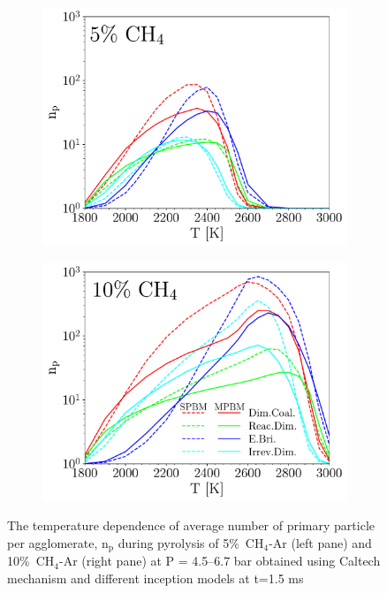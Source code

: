 \begin{figure}[H]
	\centering
	\begin{subfigure}[t]{0.4\textwidth}
		\includegraphics[width=1\textwidth]{Figures/Results/Shocktube/Agafonov2016/5CH4/n_p.pdf}
	\end{subfigure}
	\begin{subfigure}[t]{0.4\textwidth}
		\includegraphics[width=1\textwidth]{Figures/Results/Shocktube/Agafonov2016/10CH4/n_p.pdf}
	\end{subfigure}
	\caption{The temperature dependence of average number of primary particle per agglomerate, $\mathrm{n_p}$ during pyrolysis of 5\%~$\mathrm{CH_4}$-Ar (left pane) and 10\%~$\mathrm{CH_4}$-Ar (right pane) at $\mathrm{P}$ = 4.5–6.7 bar obtained using Caltech mechanism and different inception models at t=1.5 ms}
	\label{fig:shocktubenp} 
\end{figure}

